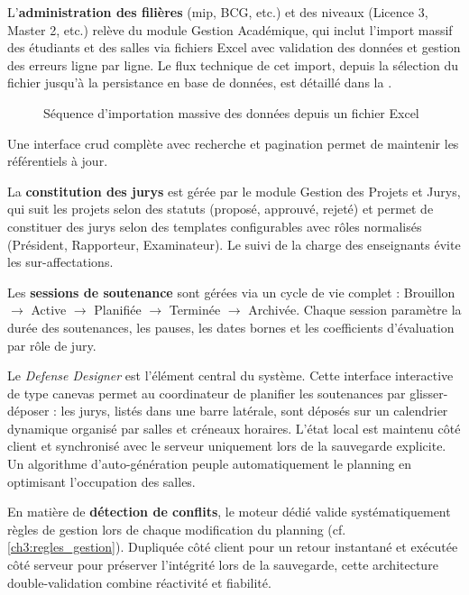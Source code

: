 L'\textbf{administration des filières} (\acrshort{mip}, BCG, etc.) et des niveaux (Licence 3, Master 2, etc.) relève du module Gestion Académique, qui inclut l'import massif des étudiants et des salles via fichiers Excel avec validation des données et gestion des erreurs ligne par ligne. Le flux technique de cet import, depuis la sélection du fichier jusqu'à la persistance en base de données, est détaillé dans la .
\begin{figure}[H]
    \centering
    \caption{Séquence d'importation massive des données depuis un fichier Excel}
    \label{fig:seq_import_data}
\end{figure}
Une interface \gls{crud} complète avec recherche et pagination permet de maintenir les référentiels à jour.

La \textbf{constitution des jurys} est gérée par le module Gestion des Projets et Jurys, qui suit les projets selon des statuts (proposé, approuvé, rejeté) et permet de constituer des jurys selon des templates configurables avec rôles normalisés (Président, Rapporteur, Examinateur). Le suivi de la charge des enseignants évite les sur-affectations.

Les \textbf{sessions de soutenance} sont gérées via un cycle de vie complet : Brouillon $\rightarrow$ Active $\rightarrow$ Planifiée $\rightarrow$ Terminée $\rightarrow$ Archivée. Chaque session paramètre la durée des soutenances, les pauses, les dates bornes et les coefficients d'évaluation par rôle de jury.

Le \textit{Defense Designer} est l'élément central du système. Cette interface interactive de type canevas permet au coordinateur de planifier les soutenances par glisser-déposer : les jurys, listés dans une barre latérale, sont déposés sur un calendrier dynamique organisé par salles et créneaux horaires. L'état local est maintenu côté client et synchronisé avec le serveur uniquement lors de la sauvegarde explicite. Un algorithme d'auto-génération peuple automatiquement le planning en optimisant l'occupation des salles.

En matière de \textbf{détection de conflits}, le moteur dédié valide systématiquement  règles de gestion lors de chaque modification du planning (cf. \cref{ch3:regles_gestion}). Dupliquée côté client pour un retour instantané et exécutée côté serveur pour préserver l'intégrité lors de la sauvegarde, cette architecture double-validation combine réactivité et fiabilité.

